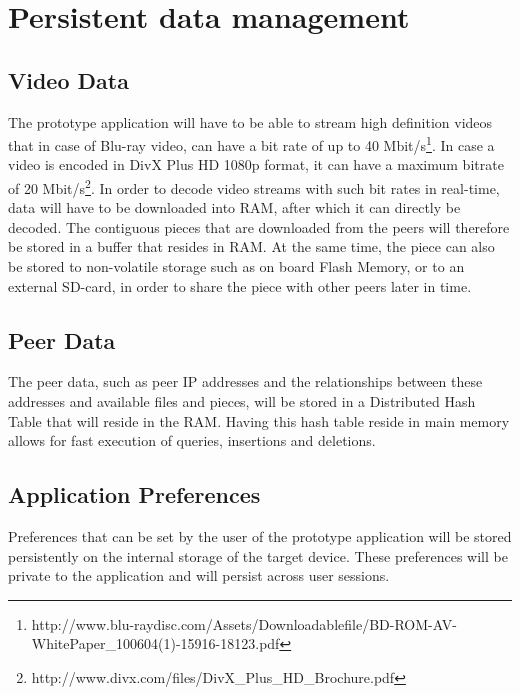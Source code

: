 \section{Persistent data management}
\label{sec:perdata}
\subsection{Video Data}
The prototype application will have to be able to stream high definition videos that in case of Blu-ray video, can have a bit rate of up to 40 Mbit/s\footnote{http://www.blu-raydisc.com/Assets/Downloadablefile/BD-ROM-AV-WhitePaper\_100604(1)-15916-18123.pdf}. In case a video is encoded in DivX Plus HD 1080p format, it can have a maximum bitrate of 20 Mbit/s\footnote{http://www.divx.com/files/DivX\_Plus\_HD\_Brochure.pdf}. In order to decode video streams with such bit rates in real-time, data will have to be downloaded into RAM, after which it can directly be decoded. The contiguous pieces that are downloaded from the peers will therefore be stored in a buffer that resides in RAM. At the same time, the piece can also be stored to non-volatile storage such as on board Flash Memory, or to an external SD-card, in order to share the piece with other peers later in time.
\subsection{Peer Data}
The peer data, such as peer IP addresses and the relationships between these addresses and available files and pieces, will be stored in a Distributed Hash Table that will reside in the RAM. Having this hash table reside in main memory allows for fast execution of queries, insertions and deletions.
\subsection{Application Preferences}
Preferences that can be set by the user of the prototype application will be stored persistently on the internal storage of the target device. These preferences will be private to the application and will persist across user sessions.



